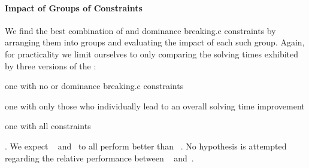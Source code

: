 \paragraph{Impact of Groups of Constraints}

We find the best combination of  and
\gls{dominance breaking.c} \glspl{constraint} by arranging them into groups and
evaluating the impact of each such group.
%
Again, for practicality we limit ourselves to only comparing the solving times
exhibited by three versions of the :
%
\begin{modelList}
  \item {}
    one with no  or \gls{dominance breaking.c}
    \glspl{constraint}
  \item {}
    one with only those who individually lead to an overall solving time
    improvement
  \item {}
    one with all \glspl{constraint}
\end{modelList}.
%
We expect ~
and~ to all perform better than ~.
%
No hypothesis is attempted regarding the relative performance between
~
and~.


